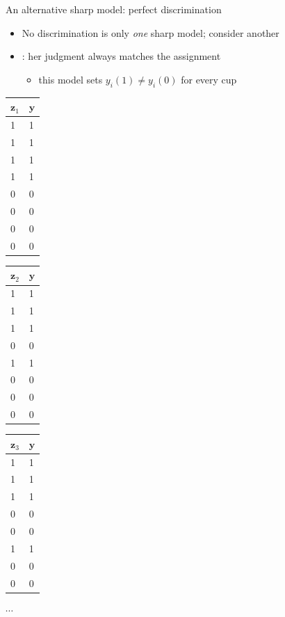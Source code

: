 \documentclass[table, xcolor = {dvipsnames}, 9pt]{beamer}
\theoremstyle{plain}
\newcommand{\mh}[1]{{\color{magenta}{#1}}}
\begin{document}
\begin{frame}{An alternative sharp model: perfect discrimination}
\vfill
\begin{itemize} \vfill
\item No discrimination is only \emph{one} sharp model; consider another \vfill
\item \mh{Perfect discrimination}: her judgment always matches the assignment \vfill
\begin{itemize} \vfill
\item this model sets $y_i(1) \neq y_i(0)$ for every cup \vfill
\end{itemize} \vfill
\end{itemize} \vfill
\begin{table}[H]
\scriptsize
    \begin{tabular}{l|l}
    \toprule
    $\mathbf{z}_1$ & $\mathbf{y}$ \\ \midrule
    1 & 1 \\ 1 & 1 \\ 1 & 1 \\ 1 & 1 \\ 0 & 0 \\ 0 & 0 \\ 0 & 0 \\ 0 & 0
    \end{tabular}
    \hfill
      \begin{tabular}{l|l}
      \toprule
    $\mathbf{z}_2$ & $\mathbf{y}$ \\ \midrule
    1 & 1 \\ 1 & 1 \\ 1 & 1 \\ 0 & 0 \\ 1 & 1 \\ 0 & 0 \\ 0 & 0 \\ 0 & 0
    \end{tabular}
     \hfill
      \begin{tabular}{l|l}
      \toprule
    $\mathbf{z}_3$ & $\mathbf{y}$ \\ \midrule
    1 & 1 \\ 1 & 1 \\ 1 & 1 \\ 0 & 0 \\ 0 & 0 \\ 1 & 1 \\ 0 & 0 \\ 0 & 0
    \end{tabular}
     \hfill $\cdots$ \hfill
      \begin{tabular}{l|l}

\end{tabular}
\end{table}
\end{frame}
\end{document}
